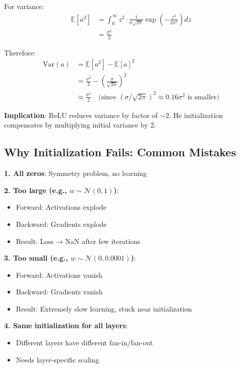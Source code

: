 For variance:
\begin{align*}
\mathbb{E}[a^2] &= \int_0^\infty z^2 \cdot \frac{1}{\sigma\sqrt{2\pi}} \exp\left(-\frac{z^2}{2\sigma^2}\right) dz \\
&= \frac{\sigma^2}{2}
\end{align*}

Therefore:
\begin{align*}
\text{Var}(a) &= \mathbb{E}[a^2] - \mathbb{E}[a]^2 \\
&= \frac{\sigma^2}{2} - \left(\frac{\sigma}{\sqrt{2\pi}}\right)^2 \\
&\approx \frac{\sigma^2}{2} \quad \text{(since } (\sigma/\sqrt{2\pi})^2 \approx 0.16\sigma^2 \text{ is smaller)}
\end{align*}

\textbf{Implication}: ReLU reduces variance by factor of $\sim$2. He initialization compensates by multiplying initial variance by 2.

\subsection{Why Initialization Fails: Common Mistakes}

\textbf{1. All zeros}: Symmetry problem, no learning

\textbf{2. Too large (e.g., $w \sim \mathcal{N}(0, 1)$)}:
\begin{itemize}
\item Forward: Activations explode
\item Backward: Gradients explode
\item Result: Loss → NaN after few iterations
\end{itemize}

\textbf{3. Too small (e.g., $w \sim \mathcal{N}(0, 0.0001)$)}:
\begin{itemize}
\item Forward: Activations vanish
\item Backward: Gradients vanish
\item Result: Extremely slow learning, stuck near initialization
\end{itemize}

\textbf{4. Same initialization for all layers}:
\begin{itemize}
\item Different layers have different fan-in/fan-out
\item Needs layer-specific scaling
\end{itemize}


